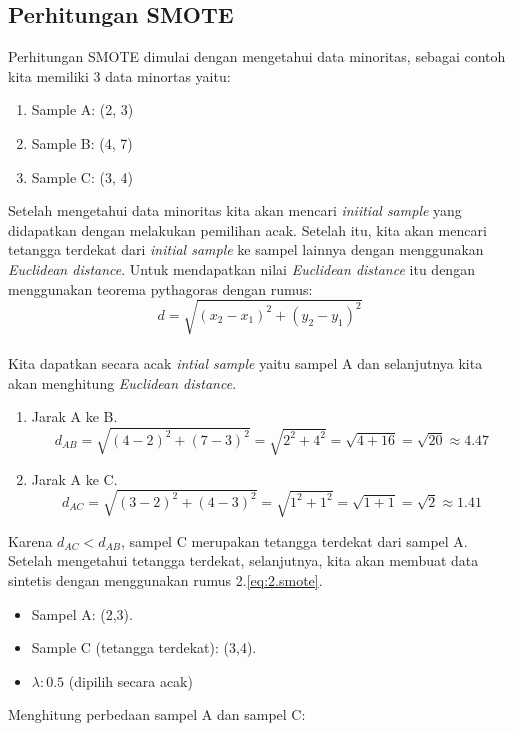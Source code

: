 \subsection{Perhitungan SMOTE}
Perhitungan SMOTE dimulai dengan mengetahui data minoritas, sebagai contoh kita memiliki 3 data minortas yaitu:
\begin{enumerate}
	\item Sample A: (2, 3)
	\item Sample B: (4, 7)
	\item Sample C: (3, 4)
\end{enumerate}
Setelah mengetahui data minoritas kita akan mencari \textit{iniitial sample} yang didapatkan dengan melakukan pemilihan acak. Setelah itu, kita akan mencari tetangga terdekat dari \textit{initial sample} ke sampel lainnya dengan menggunakan \textit{Euclidean distance}. Untuk mendapatkan nilai \textit{Euclidean distance} itu dengan menggunakan teorema pythagoras dengan rumus:\\
 \begin{equation}
	 d = \sqrt{(x_2 - x_1)^2 + (y_2 - y_1)^2}
\end{equation}
\label{eq:3.teorema pythagoras}
\\
Kita dapatkan secara acak \textit{intial sample} yaitu sampel A dan selanjutnya kita akan menghitung \textit{Euclidean distance}.
\begin{enumerate}
	\item  Jarak A ke B.\\
		$$
			d_{AB} = \sqrt{(4-2)^2 + (7-3)^2} = \sqrt{2^2 + 4^2} = \sqrt{4 + 16} = \sqrt{20} \approx 4.47
		$$

	\item Jarak A ke C.\\
		$$
			d_{AC} = \sqrt{(3-2)^2 + (4-3)^2} = \sqrt{1^2 + 1^2} = \sqrt{1 + 1} = \sqrt{2} \approx 1.41
		$$
\end{enumerate}
Karena $d_{AC} < d_{AB}$, sampel C merupakan tetangga terdekat dari sampel A. Setelah mengetahui tetangga terdekat, selanjutnya, kita akan membuat data sintetis dengan menggunakan rumus 2.\ref{eq:2.smote}.
\begin{itemize}
	\item Sampel A: (2,3).
	\item Sample C (tetangga terdekat): (3,4).
	\item $\lambda: 0.5$ (dipilih secara acak)
\end{itemize}
Menghitung perbedaan sampel A dan sampel C:
\\
